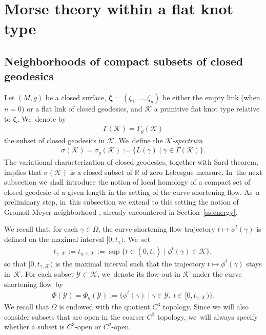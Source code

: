 \documentclass[JEP,XML,SOM,Unicode,NoFloatCountersInSection,published]{cedram}
\let\sep\mid
\let\bm\boldsymbol
\newcommand{\R}{\mathbb{R}}
\newcommand{\KK}{\mathcal{K}}
\theoremstyle{plain}
\theoremstyle{definition}
\begin{document}
\section{Morse theory within a flat knot type}\label{s:Morse}

\subsection{Neighborhoods of compact subsets of closed geodesics}\label{ss:nbhds}

Let $(M,g)$ be a closed surface, $\bm\zeta=(\zeta_1,\dots,\zeta_n)$ be either the empty link (when $n=0$) or a flat link of closed geodesics, and $\KK$ a primitive flat knot type relative to $\bm\zeta$. We~denote by
\begin{align*}
\Gamma(\KK)=\Gamma_g(\KK)
\end{align*}
the subset of closed geodesics in $\KK$. We~define the \emph{$\KK$-spectrum}
\begin{align*}
\sigma(\KK) = \sigma_g(\KK) := \big\{ L(\gamma)\sep \gamma\in\Gamma(\KK) \big\}.
\end{align*}
The variational characterization of closed geodesics, together with Sard theorem, implies that $\sigma(\KK)$ is a closed subset of $\R$ of zero Lebesgue measure. In~the next subsection we shall introduce the notion of local homology of a compact set of closed geodesic of a given length in the setting of the curve shortening flow. As~a preliminary step, in~this subsection we extend to this setting the notion of Gromoll-Meyer neighborhood \cite{Gromoll:1969aa,Gromoll:1969ab}, already encountered in Section~\ref{ss:energy}.

We recall that, for each $\gamma\in\Omega$, the curve shortening flow trajectory $t\mapsto\phi^t(\gamma)$ is defined on the maximal interval $[0,t_\gamma)$. We~set
\begin{align}
\label{e:exit_time_K}
t_{\gamma,\KK}:=t_{g,\gamma,\KK}:=\sup\bigl\{ t\in(0,t_{\gamma})\sep \phi^t(\gamma)\in\KK \bigr\},
\end{align}
so that $[0,t_{\gamma,\KK})$ is the maximal interval such that the trajectory $t\mapsto\phi^t(\gamma)$ stays in~$\KK$.
For each subset $\mathcal Y\subset\KK$, we~denote its flow-out in $\KK$ under the curve shortening flow~by
\begin{align*}
\Phi(\mathcal Y)
=
\Phi_g(\mathcal Y)
:=
\bigl\{ \phi^t(\gamma)\sep \gamma\in \mathcal Y,\ t\in[0,t_{\gamma,\KK}) \bigr\}.
\end{align*}
We recall that $\Omega$ is endowed with the quotient $C^3$ topology. Since we will also consider subsets that are open in the coarser $C^2$ topology, we~will always specify whether a subset is $C^3$-open or $C^2$-open.
\end{document}
